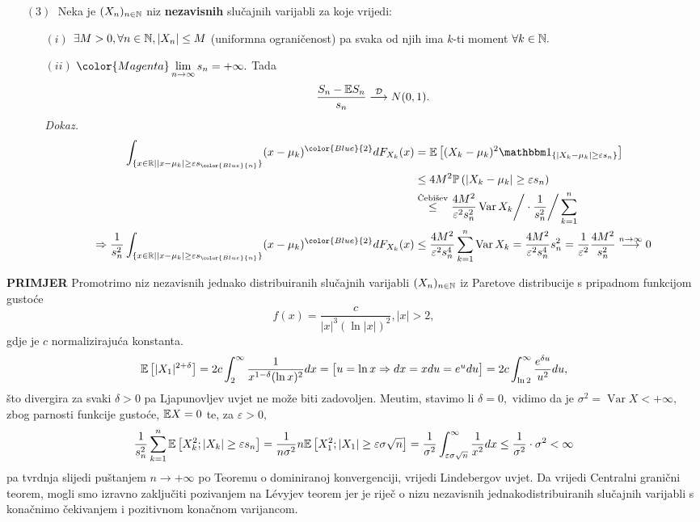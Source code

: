 \documentclass{article}
\newcommand{\Var}{\operatorname{Var}}
\begin{document}
\begin{enumerate}
\begin{itemize}
    \end{itemize}
    \item[\((3)\)\textcolor{white}{.}\textcolor{Magenta}{\varhexstar}] Neka je \((X_n)_{n\in\Bbb N}\) niz \textbf{nezavisnih} slučajnih varijabli za koje vrijedi:\begin{enumerate}
        \item[\((i)\)] \(\exists M>0,\forall n\in\Bbb N,|X_n|\le M\) (uniformna ograničenost) pa svaka od njih ima \(k\)-ti moment \(\forall k\in\Bbb N.\)
        \item[\((ii)\)] \(\color{Magenta}\displaystyle\lim_{n\to\infty}s_n=+\infty.\) Tada \[\frac{S_n-\Bbb ES_n}{s_n}\overset{\mathcal D}{\longrightarrow}N(0,1).\] \textit{Dokaz.} \[\begin{aligned}\int_{\{x\in\Bbb R\mid |x-\mu_k|\ge\varepsilon s_{\color{Blue}{n}}\}}(x-\mu_k)^{\color{Blue}{2}}dF_{X_k}(x)&=\Bbb E\left[(X_k-\mu_k)^2\mathbbm 1_{\left\{|X_k-\mu_k|\ge\varepsilon s_n\right\}}\right]\\&\le 4M^2\Bbb P\left(|X_k-\mu_k|\ge\varepsilon s_n\right)\\&\overset{\text{Čebišev}}{\le}\frac{4M^2}{\varepsilon^2s_n^2}\Var X_k\bigg/\cdot \frac1{s_n^2}\bigg/\sum_{k=1}^n\\\Rightarrow \frac1{s_n^2}\int_{\{x\in\Bbb R\mid |x-\mu_k|\ge\varepsilon s_{\color{Blue}{n}}\}}(x-\mu_k)^{\color{Blue}{2}}dF_{X_k}(x)&\le\frac{4M^2}{\varepsilon^2s_n^4}\sum_{k=1}^n\Var X_k=\frac{4M^2}{\varepsilon^2 s_n^4}s_n^2=\frac1{\varepsilon^2}\frac{4M^2}{s_n^2}\overset{n\to\infty}{\longrightarrow}0\end{aligned}\]
    \end{enumerate}
\end{enumerate} 
\textbf{PRIMJER}\newline
Promotrimo niz nezavisnih jednako distribuiranih slučajnih varijabli \((X_n)_{n\in\Bbb N}\) iz Paretove distribucije s pripadnom funkcijom gustoće \[f(x)=\frac{c}{|x|^3(\ln|x|)^2},|x|>2,\] gdje je \(c\) normalizirajuća konstanta. \[\Bbb E\left[|X_1|^{2+\delta}\right]=2c\int_2^\infty\frac1{x^{1-\delta}(\ln x)^2}dx=\begin{bmatrix}u=\ln x\Rightarrow dx= xdu=e^udu\end{bmatrix}=2c\int_{\ln 2}^\infty\frac{e^{\delta u}}{u^2}du,\] što divergira za svaki \(\delta>0\) pa Ljapunovljev uvjet ne može biti zadovoljen. Me\dj{}utim, stavimo li \(\delta=0,\) vidimo da je \(\sigma^2=\Var X<+\infty,\) zbog parnosti funkcije gustoće, \(\Bbb EX=0\) te, za \(\varepsilon>0,\) \[\frac1{s_n^2}\sum_{k=1}^n\Bbb E\left[X_k^2;|X_k|\ge\varepsilon s_n\right]=\frac1{n\sigma^2}n\Bbb E\left[X_1^2; |X_1|\ge\varepsilon\sigma\sqrt n\right]=\frac1{\sigma^2}\int_{\varepsilon\sigma\sqrt n}^\infty\frac1{x^2}dx\le\frac1{\sigma^2}\cdot\sigma^2<\infty\] pa tvrdnja slijedi puštanjem \(n\to+\infty\) po Teoremu o dominiranoj konvergenciji, vrijedi Lindebergov uvjet. Da vrijedi Centralni granični teorem, mogli smo izravno zaključiti pozivanjem na L\'evyjev teorem jer je riječ o nizu nezavisnih jednakodistribuiranih slučajnih varijabli s konačnimo čekivanjem i pozitivnom konačnom varijancom.
\end{document}

